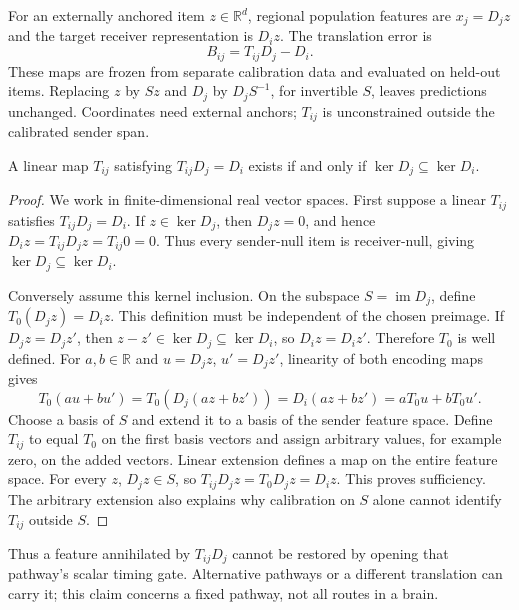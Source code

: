 \documentclass[submission,nolinenumbers]{esj}
\newcommand{\R}{\mathbb R}
\newcommand{\Dj}{D_j}
\newcommand{\Di}{D_i}
\newcommand{\Tij}{T_{ij}}
\newcommand{\Bij}{B_{ij}}
\DeclareMathOperator{\im}{im}
\DeclareMathOperator{\Ker}{ker}
\begin{document}
For an externally anchored item $z\in\R^d$, regional population features are $x_j=\Dj z$ and the target receiver representation is $\Di z$. The translation error is
\begin{equation}
\Bij=\Tij \Dj-\Di.\label{eq:dictionary}
\end{equation}
These maps are frozen from separate calibration data and evaluated on held-out items. Replacing $z$ by $Sz$ and $\Dj$ by $\Dj S^{-1}$, for invertible $S$, leaves predictions unchanged. Coordinates need external anchors; $\Tij$ is unconstrained outside the calibrated sender span.

\begin{proposition}\label{prop:translation}
A linear map $\Tij$ satisfying $\Tij \Dj=\Di$ exists if and only if $\Ker \Dj\subseteq\Ker \Di$.
\end{proposition}
\begin{proof}
We work in finite-dimensional real vector spaces. First suppose a linear $T_{ij}$ satisfies $T_{ij}D_j=D_i$. If $z\in\Ker D_j$, then $D_jz=0$, and hence $D_iz=T_{ij}D_jz=T_{ij}0=0$. Thus every sender-null item is receiver-null, giving $\Ker D_j\subseteq\Ker D_i$.

Conversely assume this kernel inclusion. On the subspace $S=\im D_j$, define $T_0(D_jz)=D_iz$. This definition must be independent of the chosen preimage. If $D_jz=D_jz'$, then $z-z'\in\Ker D_j\subseteq\Ker D_i$, so $D_iz=D_iz'$. Therefore $T_0$ is well defined. For $a,b\in\R$ and $u=D_jz$, $u'=D_jz'$, linearity of both encoding maps gives
\[
T_0(au+bu')=T_0(D_j(az+bz'))=D_i(az+bz')=aT_0u+bT_0u'.
\]
Choose a basis of $S$ and extend it to a basis of the sender feature space. Define $T_{ij}$ to equal $T_0$ on the first basis vectors and assign arbitrary values, for example zero, on the added vectors. Linear extension defines a map on the entire feature space. For every $z$, $D_jz\in S$, so $T_{ij}D_jz=T_0D_jz=D_iz$. This proves sufficiency. The arbitrary extension also explains why calibration on $S$ alone cannot identify $T_{ij}$ outside $S$.
\end{proof}
Thus a feature annihilated by $\Tij \Dj$ cannot be restored by opening that pathway's scalar timing gate. Alternative pathways or a different translation can carry it; this claim concerns a fixed pathway, not all routes in a brain.
\end{document}
